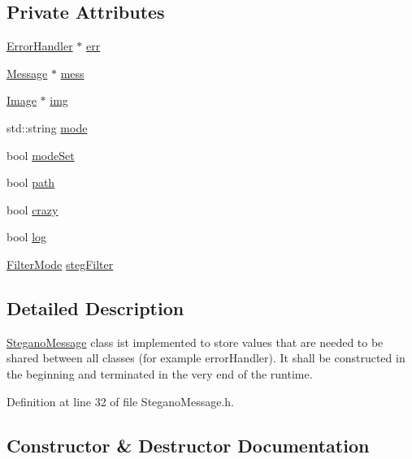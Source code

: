 \subsection*{Private Attributes}
\begin{DoxyCompactItemize}
\item 
\mbox{\hyperlink{classErrorHandler}{Error\+Handler}} $\ast$ \mbox{\hyperlink{classSteganoMessage_a26b631e00716be7a89cbcf22cf0b7291}{err}}
\item 
\mbox{\hyperlink{classMessage}{Message}} $\ast$ \mbox{\hyperlink{classSteganoMessage_a64f70bbacb0662cebe764316658da35d}{mess}}
\item 
\mbox{\hyperlink{classImage}{Image}} $\ast$ \mbox{\hyperlink{classSteganoMessage_acd7dba217d5df515d93ddf814734ecf4}{img}}
\item 
std\+::string \mbox{\hyperlink{classSteganoMessage_a8772194b7823da730648f8d4c06334a8}{mode}}
\item 
bool \mbox{\hyperlink{classSteganoMessage_ae1da17c621a8db71fa4eb3b148a82ceb}{mode\+Set}}
\item 
bool \mbox{\hyperlink{classSteganoMessage_a399f4c181d3b7b15ccdb5c925a7a1f51}{path}}
\item 
bool \mbox{\hyperlink{classSteganoMessage_aa66c9e1d0367981d42ede819e1a51131}{crazy}}
\item 
bool \mbox{\hyperlink{classSteganoMessage_a687c455d3f09eb5349e0358cb07aa21c}{log}}
\item 
\mbox{\hyperlink{constants_8h_a36bd51b89b9e0e6e4dbbe565b9155083}{Filter\+Mode}} \mbox{\hyperlink{classSteganoMessage_af20fb772ae34deaccd23144b38f06320}{steg\+Filter}}
\end{DoxyCompactItemize}


\subsection{Detailed Description}
\mbox{\hyperlink{classSteganoMessage}{Stegano\+Message}} class ist implemented to store values that are needed to be shared between all classes (for example error\+Handler). It shall be constructed in the beginning and terminated in the very end of the runtime. 

Definition at line 32 of file Stegano\+Message.\+h.



\subsection{Constructor \& Destructor Documentation}
\mbox{\label{classSteganoMessage_a7a14cbd03ebca6764f8b234f8dcd1697}} 
